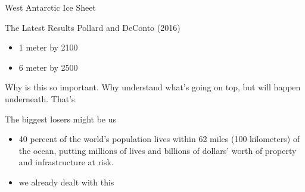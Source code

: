 \documentclass[hide notes,intlimits]{beamer}
\begin{document}
\begin{frame}{West Antarctic Ice Sheet}
\end{frame}

\begin{frame}{The Latest Results}
  Pollard and DeConto (2016)
  \begin{itemize}
  \item 1 meter by 2100
  \item 6 meter by 2500
  \end{itemize}
Why is this so important. Why understand what's going on top, but will happen underneath. That's 
\end{frame}


\begin{frame}{The biggest losers might be us}
\begin{itemize}
\item 40 percent of the world's population lives within 62 miles (100 kilometers) of the ocean, putting millions of lives and billions of dollars' worth of property and infrastructure at risk. 
\item we already dealt with this
\end{itemize}
\end{frame}



\end{document}
